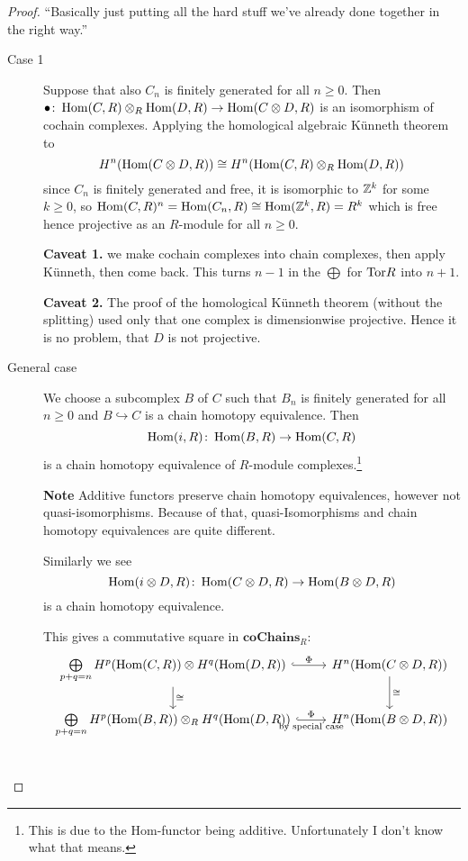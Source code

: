 \documentclass[language=english]{TemplateLecture}
\begin{document}
\begin{proof}
    \enquote{Basically just putting all the hard stuff we've already done together in the right way.}
    \begin{description}
        \item[Case 1] Suppose that also \(C_n\) is finitely generated for all \(n \geq 0\). Then \(\bullet \colon \operatorname{Hom}(C,R) \otimes _R \operatorname{Hom}(D,R) \to \operatorname{Hom}(C\otimes D, R)\) is an isomorphism of cochain complexes. Applying the homological algebraic Künneth theorem to
        \[H^n(\operatorname{Hom}(C\otimes D,R)) \cong H^n(\operatorname{Hom}(C,R) \otimes_R \operatorname{Hom}(D,R))\]
        since \(C_n\) is finitely generated and free, it is isomorphic to \(\mathbb{Z}^k\) for some \(k \geq 0\), so \(\operatorname{Hom}(C,R)^n = \operatorname{Hom}(C_n,R) \cong \operatorname{Hom}(\mathbb{Z}^k, R) = R^k\) which is free hence projective as an \(R\)-module for all \(n \geq 0\).

        \textbf{Caveat 1.} we make cochain complexes into chain complexes, then apply Künneth, then come back. This turns \(n-1\) in the \(\bigoplus\) for \(\mathrm{Tor} R\) into \(n+1\).

        \textbf{Caveat 2.} The proof of the homological Künneth theorem (without the splitting) used only that one complex is dimensionwise projective. Hence it is no problem, that \(D\) is not projective.

        \item[General case] We choose a subcomplex \(B\) of \(C\) such that \(B_n\) is finitely generated for all \(n \geq 0\) and \(B \hookrightarrow C\) is a chain homotopy equivalence. Then
        \[\operatorname{Hom}(i, R) \colon \operatorname{Hom}(B,R) \to \operatorname{Hom}(C,R)\]
        is a chain homotopy equivalence of \(R\)-module complexes.\footnote{This is due to the Hom-functor being additive. Unfortunately I don't know what that means.}
        
        \textbf{Note} Additive functors preserve chain homotopy equivalences, however not quasi-isomorphisms. Because of that, quasi-Isomorphisms and chain homotopy equivalences are quite different.

        Similarly we see
        \[\operatorname{Hom}(i\otimes D, R) \colon \operatorname{Hom}(C\otimes D, R) \to \operatorname{Hom}(B\otimes D, R)\]
        is a chain homotopy equivalence.

        This gives a commutative square in \(\mathbf{coChains}_R\):
        \[\begin{tikzcd}
            {\bigoplus\limits_{p+q = n} H^p(\Hom(C,R)) \otimes H^q(\Hom(D,R))} \ar[r, hook, "\Phi"] \ar[d, "\cong"] & {H^n(\Hom(C\otimes D, R))} \ar[d, "\cong"] \\
            {\bigoplus\limits_{p+q = n} H^p(\Hom(B,R)) \otimes_R H^q(\Hom(D,R))} \ar[r, hook, "\Phi", "\text{by special case}"'] & {H^n(\Hom(B\otimes D, R))} \\
        \end{tikzcd}\]
    \end{description}
\end{proof}
\end{document}
